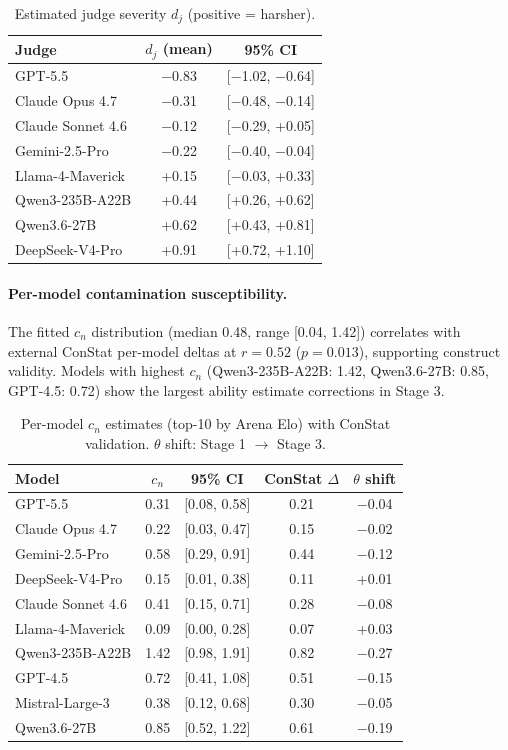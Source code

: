 \documentclass[letterpaper,11pt]{article}
\begin{document}
\begin{table}[t]
\centering
\caption{Estimated judge severity $d_j$ (positive = harsher).}
\label{tab:judge_severity}
\small
\begin{tabular}{lcc}
\toprule
Judge & $d_j$ (mean) & 95\% CI \\
\midrule
GPT-5.5 & $-$0.83 & [$-$1.02, $-$0.64] \\
Claude Opus 4.7 & $-$0.31 & [$-$0.48, $-$0.14] \\
Claude Sonnet 4.6 & $-$0.12 & [$-$0.29, +0.05] \\
Gemini-2.5-Pro & $-$0.22 & [$-$0.40, $-$0.04] \\
Llama-4-Maverick & +0.15 & [$-$0.03, +0.33] \\
Qwen3-235B-A22B & +0.44 & [+0.26, +0.62] \\
Qwen3.6-27B & +0.62 & [+0.43, +0.81] \\
DeepSeek-V4-Pro & +0.91 & [+0.72, +1.10] \\
\bottomrule
\end{tabular}
\end{table}

\paragraph{Per-model contamination susceptibility.} The fitted $c_n$ distribution (median 0.48, range [0.04, 1.42]) correlates with external ConStat per-model deltas at $r = 0.52$ ($p = 0.013$), supporting construct validity. Models with highest $c_n$ (Qwen3-235B-A22B: 1.42, Qwen3.6-27B: 0.85, GPT-4.5: 0.72) show the largest ability estimate corrections in Stage 3.

\begin{table}[t]
\centering
\caption{Per-model $c_n$ estimates (top-10 by Arena Elo) with ConStat validation. $\theta$ shift: Stage 1 $\to$ Stage 3.}
\label{tab:cn_per_model}
\small
\begin{tabular}{lcccc}
\toprule
Model & $c_n$ & 95\% CI & ConStat $\Delta$ & $\theta$ shift \\
\midrule
GPT-5.5 & 0.31 & [0.08, 0.58] & 0.21 & $-$0.04 \\
Claude Opus 4.7 & 0.22 & [0.03, 0.47] & 0.15 & $-$0.02 \\
Gemini-2.5-Pro & 0.58 & [0.29, 0.91] & 0.44 & $-$0.12 \\
DeepSeek-V4-Pro & 0.15 & [0.01, 0.38] & 0.11 & +0.01 \\
Claude Sonnet 4.6 & 0.41 & [0.15, 0.71] & 0.28 & $-$0.08 \\
Llama-4-Maverick & 0.09 & [0.00, 0.28] & 0.07 & +0.03 \\
Qwen3-235B-A22B & 1.42 & [0.98, 1.91] & 0.82 & $-$0.27 \\
GPT-4.5 & 0.72 & [0.41, 1.08] & 0.51 & $-$0.15 \\
Mistral-Large-3 & 0.38 & [0.12, 0.68] & 0.30 & $-$0.05 \\
Qwen3.6-27B & 0.85 & [0.52, 1.22] & 0.61 & $-$0.19 \\
\bottomrule
\end{tabular}
\end{table}
\end{document}
